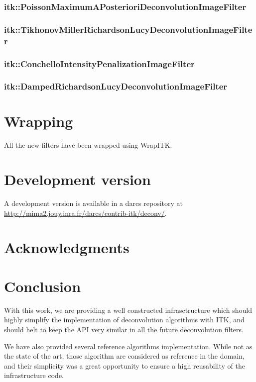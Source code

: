 \documentclass{InsightArticle}
\begin{document}
\subsubsection{itk::PoissonMaximumAPosterioriDeconvolutionImageFilter}
\subsubsection{itk::TikhonovMillerRichardsonLucyDeconvolutionImageFilter}
\subsubsection{itk::ConchelloIntensityPenalizationImageFilter}
\subsubsection{itk::DampedRichardsonLucyDeconvolutionImageFilter}

\section{Wrapping}

All the new filters have been wrapped using WrapITK.

\section{Development version}

A development version is available in a darcs repository at
\url{http://mima2.jouy.inra.fr/darcs/contrib-itk/deconv/}.

\section{Acknowledgments}


\section{Conclusion}

With this work, we are providing a well constructed infrasctructure which should highly simplify the implementation
of deconvolution algorithms with ITK, and should helt to keep the API very similar in all the future deconvolution filters.

We have also provided several reference algorithms implementation. While not as the state of the art, those algorithm are
considered as reference in the domain, and their simplicity was a great opportunity to ensure a high reusability of the
infrastructure code.
\end{document}
